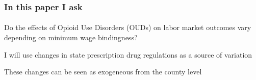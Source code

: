 \begin{frame}

    \frametitle{In this paper I ask} %
    \framesubtitle{}  %
    \rmfamily %
    
    \begin{wideitemize}
        \item Do the effects of \textcolor{fblu}{Opioid Use Disorders} (\textcolor{fblu}{OUDs}) on labor market outcomes vary depending on minimum wage bindingness?
    \end{wideitemize}

    \vspace{9pt}
    I will use \textcolor{fblu}{changes in state prescription drug regulations} as a source of variation
    \vspace{9pt} 
    
    \begin{wideitemize}
        \item These changes can be seen as \textcolor{fblu}{exogeneous} from the \textcolor{fblu}{county level}
    \end{wideitemize}
    
\end{frame}


